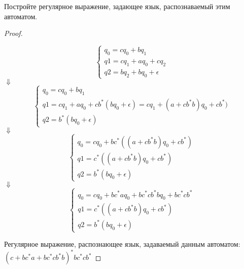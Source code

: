 \begin{problem}
Постройте регулярное выражение, задающее язык, распознаваемый этим автоматом.\\
\begin{center}
\end{center}
\end{problem}
\begin{proof} $ $\\
\begin{center}
\begin{equation*}
 \begin{cases}
   q_0 = cq_0 + bq_1
   \\
   q1 = cq_1 + aq_0 + cq_2
   \\
   q2 = bq_2 + bq_0 + \epsilon
 \end{cases}
\end{equation*}
$\Downarrow$
\begin{equation*}
 \begin{cases}
   q_0 = cq_0 + bq_1
   \\
   q1 = cq_1 + aq_0 + cb^*(bq_0+\epsilon) = cq_1 + (a+cb^*b)q_0 + cb^*)
   \\
   q2 = b^*(bq_0+\epsilon)
 \end{cases}
\end{equation*}
$\Downarrow$
\begin{equation*}
 \begin{cases}
   q_0 = cq_0+bc^*((a+cb^*b)q_0+cb^*)
   \\
   q1 = c^*((a+cb^*b)q_0+cb^*)
   \\
   q2 = b^*(bq_0+\epsilon)
 \end{cases}
\end{equation*}
$\Downarrow$
\begin{equation*}
 \begin{cases}
   q_0 = cq_0+bc^*aq_0 + bc^*cb^*bq_0+bc^*cb^*
   \\
   q1 = c^*((a+cb^*b)q_0+cb^*)
   \\
   q2 = b^*(bq_0+\epsilon)
 \end{cases}
\end{equation*}
\end{center}
Регулярное выражение, распознающее язык, задаваемый данным автоматом: $(c+bc^*a+bc^*cb^*b)^*bc^*cb^*$
\end{proof}


